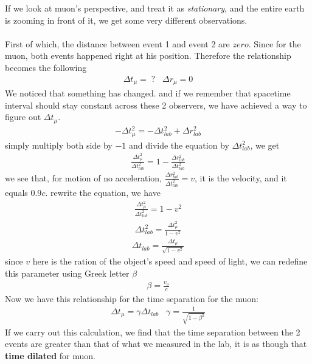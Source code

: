\documentclass[11pt,letterpaper]{book}
\begin{document}
If we look at muon's perspective, and treat it as \textit{stationary}, and the entire earth is zooming in front of it, we get some very different observations.\\
\\
First of which, the distance between event 1 and event 2 are $zero$. Since for the muon, both events happened right at his position. Therefore the relationship becomes the following
\begin{align}
\Delta t_\mu = \;? \;\;\; \Delta r_\mu = 0
\end{align}
We noticed that something has changed. and if we remember that spacetime interval should stay constant across these 2 observers, we have achieved a way to figure out $\Delta t_\mu$.
\begin{align}
-\Delta t_\mu^2 = -\Delta t_{lab}^2 +\Delta r_{lab}^2
\end{align}
simply multiply both side by $-1$ and divide the equation by $\Delta t_{lab}^2$, we get 
\begin{align}
\frac{\Delta t_\mu^2}{\Delta t_{lab}^2} = 1 - \frac{\Delta r_{lab}^2}{\Delta t_{lab}^2}
\end{align}
we see that, for motion of no acceleration, $\frac{\Delta r_{lab}^2}{\Delta t_{lab}^2} = v$, it is the velocity, and it equals $0.9c$.
rewrite the equation, we have
\begin{align}
\frac{\Delta t_\mu^2}{\Delta t_{lab}^2} = 1-v^2
\end{align}
\begin{align}
\Delta t_{lab}^2 = \frac{\Delta t_\mu^2}{1-v^2}
\end{align}
\begin{align}
\Delta t_{lab} = \frac{\Delta t_\mu}{\sqrt{1-v^2}}
\end{align}
since $v$ here is the ration of the object's speed and speed of light, we can redefine this parameter using Greek letter $\beta$
\begin{align}
\beta = \frac{v_o}{c}
\end{align}
Now we have this relationship for the time separation for the muon:
\begin{align}
\Delta t_\mu = \gamma \Delta t_{lab} \;\;\; \gamma = \frac{1}{\sqrt{1-\beta^2}}
\end{align}
\label{time dilation derivation}
If we carry out this calculation, we find that the time separation between the 2 events are greater than that of what we measured in the lab, it is as though that \textbf{time dilated} for muon. 
\end{document}

